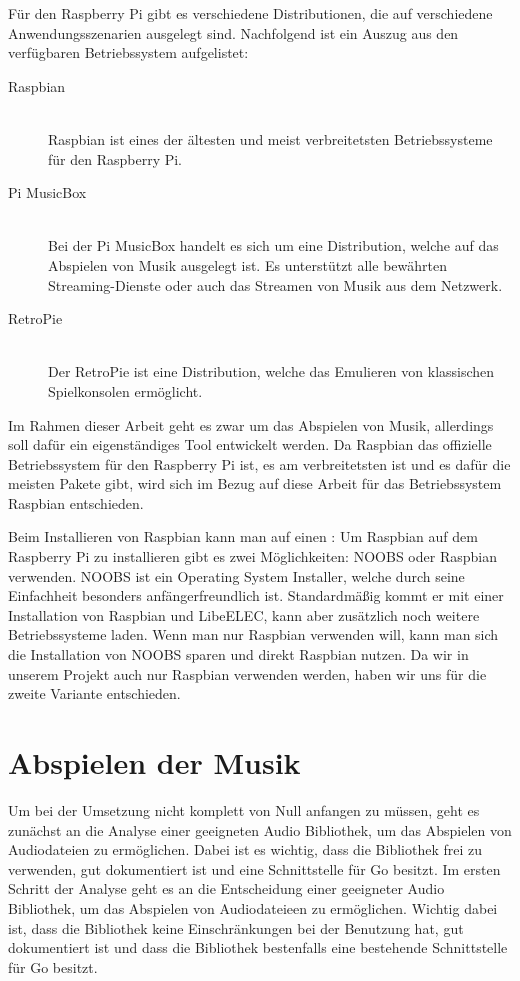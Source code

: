 Für den Raspberry Pi gibt es verschiedene Distributionen, die auf verschiedene
Anwendungsszenarien ausgelegt sind. Nachfolgend ist ein Auszug aus den verfügbaren
Betriebssystem aufgelistet: 
\begin{description}
\item[Raspbian] \hfill \\ 
    Raspbian ist eines der ältesten und meist verbreitetsten Betriebssysteme für
    den Raspberry Pi. 
\item[Pi MusicBox] \hfill \\ 
    Bei der Pi MusicBox handelt es sich um eine Distribution, welche auf das
    Abspielen von Musik ausgelegt ist. Es unterstützt alle bewährten
    Streaming-Dienste oder auch das Streamen von Musik aus dem Netzwerk.
\item[RetroPie] \hfill \\
    Der RetroPie ist eine Distribution, welche das Emulieren von klassischen
    Spielkonsolen ermöglicht.
\end{description}

Im Rahmen dieser Arbeit geht es zwar um das Abspielen von Musik, allerdings
soll dafür ein eigenständiges Tool entwickelt werden. Da Raspbian das
offizielle Betriebssystem für den Raspberry Pi ist, es am verbreitetsten ist
und es dafür die meisten Pakete gibt, wird sich im Bezug auf diese Arbeit für
das Betriebssystem Raspbian entschieden. \autocite{Best_Raspberry_Pi_distros_2019}
\hfill \break

Beim Installieren von Raspbian kann man auf einen :
Um Raspbian auf dem Raspberry Pi zu installieren gibt es zwei Möglichkeiten:
\ac{NOOBS} oder Raspbian verwenden. \ac{NOOBS} ist ein Operating System
Installer, welche durch seine Einfachheit besonders anfängerfreundlich ist.
Standardmäßig kommt er mit einer Installation von Raspbian und LibeELEC, kann
aber zusätzlich noch weitere Betriebssysteme laden. Wenn man nur Raspbian
verwenden will, kann man sich die Installation von \ac{NOOBS} sparen und direkt
Raspbian nutzen. Da wir in unserem Projekt auch nur Raspbian verwenden werden,
haben wir uns für die zweite Variante entschieden. \autocite{monk_2019}


\section{Abspielen der Musik}
Um bei der Umsetzung nicht komplett von Null anfangen zu müssen, geht es
zunächst an die Analyse einer geeigneten Audio Bibliothek, um das Abspielen von
Audiodateien zu ermöglichen. Dabei ist es wichtig, dass die Bibliothek frei zu
verwenden, gut dokumentiert ist und eine Schnittstelle für Go besitzt.  Im
ersten Schritt der Analyse geht es an die Entscheidung einer geeigneter Audio
Bibliothek, um das Abspielen von Audiodateieen zu ermöglichen. Wichtig dabei
ist, dass die Bibliothek keine Einschränkungen bei der Benutzung hat, gut
dokumentiert ist und dass die Bibliothek bestenfalls eine bestehende
Schnittstelle für Go besitzt.
